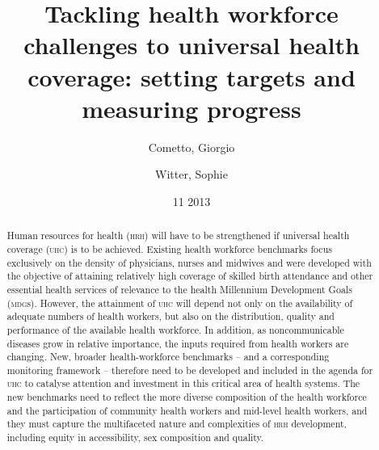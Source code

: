 \documentclass{article}
\title{Tackling health workforce challenges to universal health coverage:
setting targets
and measuring progress\titlegroup{}}
\author[{a}]{Cometto, Giorgio}
\author[{b}]{Witter, Sophie}
\affil[a]{World Health Organization}
\affil[b]{Queen Margaret University}
\date{ 11 2013}
\begin{document}
\newcommand{\lingua}{Inglês}
\maketitle
\tableofcontents

\begingroup
\renewcommand{\section}[1]{\subsection*{#1}}

\begin{abstract}

Human resources for health (\textsc{hrh}) will have to be strengthened if universal
health coverage (\textsc{uhc})
is to be achieved. Existing health workforce benchmarks focus exclusively on the
density of
physicians, nurses and midwives and were developed with the objective of
attaining relatively high
coverage of skilled birth attendance and other essential health services of
relevance to the health
Millennium Development Goals (\textsc{mdg}s). However, the attainment of \textsc{uhc} will depend
not only on the
availability of adequate numbers of health workers, but also on the
distribution, quality and
performance of the available health workforce. In addition, as noncommunicable
diseases grow in
relative importance, the inputs required from health workers are changing. New,
broader
health-workforce benchmarks – and a corresponding monitoring framework –
therefore
need to be developed and included in the agenda for \textsc{uhc} to catalyse attention
and investment in this
critical area of health systems. The new benchmarks need to reflect the more
diverse composition of
the health workforce and the participation of community health workers and
mid-level health workers,
and they must capture the multifaceted nature and complexities of \textsc{hrh}
development, including equity
in accessibility, sex composition and quality.

\end{abstract}
\endgroup
\end{document}
